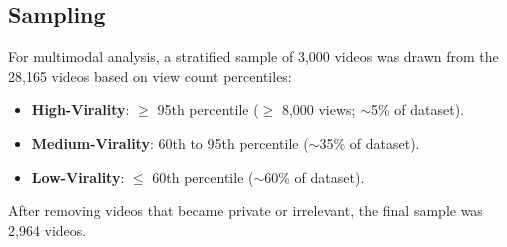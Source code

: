 \documentclass[12pt,a4paper]{report}
\begin{document}
\subsection{Sampling}
For multimodal analysis, a stratified sample of 3,000 videos was drawn from the 28,165 videos based on view count percentiles:
\begin{itemize}
    \item \textbf{High-Virality}: $\geq$ 95th percentile ($\geq$ 8,000 views; $\sim$5\% of dataset).
    \item \textbf{Medium-Virality}: 60th to 95th percentile ($\sim$35\% of dataset).
    \item \textbf{Low-Virality}: $\leq$ 60th percentile ($\sim$60\% of dataset).
\end{itemize}
After removing videos that became private or irrelevant, the final sample was 2,964 videos.
\end{document}
